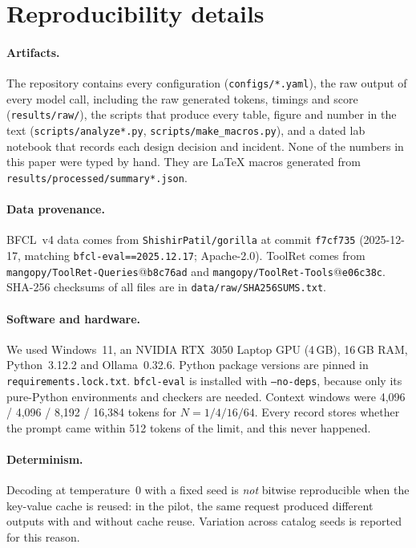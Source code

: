\section{Reproducibility details}
\label{app:repro}

\paragraph{Artifacts.}
The repository contains every configuration (\texttt{configs/*.yaml}), the raw output of every model call, including the raw generated tokens, timings and score (\texttt{results/raw/}), the scripts that produce every table, figure and number in the text (\texttt{scripts/analyze*.py}, \texttt{scripts/make\_macros.py}), and a dated lab notebook that records each design decision and incident.
None of the numbers in this paper were typed by hand. They are \LaTeX{} macros generated from \texttt{results/processed/summary*.json}.

\paragraph{Data provenance.}
BFCL~v4 data comes from \texttt{ShishirPatil/gorilla} at commit \texttt{f7cf735} (2025-12-17, matching \texttt{bfcl-eval==2025.12.17}; Apache-2.0).
ToolRet comes from \texttt{mangopy/ToolRet-Queries}@\texttt{b8c76ad} and \texttt{mangopy/ToolRet-Tools}@\texttt{e06c38c}.
SHA-256 checksums of all files are in \texttt{data/raw/SHA256SUMS.txt}.

\paragraph{Software and hardware.}
We used Windows~11, an NVIDIA RTX~3050 Laptop GPU (4\,GB), 16\,GB RAM, Python~3.12.2 and Ollama~0.32.6.
Python package versions are pinned in \texttt{requirements.lock.txt}. \texttt{bfcl-eval} is installed with \texttt{--no-deps}, because only its pure-Python environments and checkers are needed.
Context windows were 4{,}096 / 4{,}096 / 8{,}192 / 16{,}384 tokens for $N=1/4/16/64$. Every record stores whether the prompt came within 512 tokens of the limit, and this never happened.

\paragraph{Determinism.}
Decoding at temperature~0 with a fixed seed is \emph{not} bitwise reproducible when the key-value cache is reused: in the pilot, the same request produced different outputs with and without cache reuse. Variation across catalog seeds is reported for this reason.

